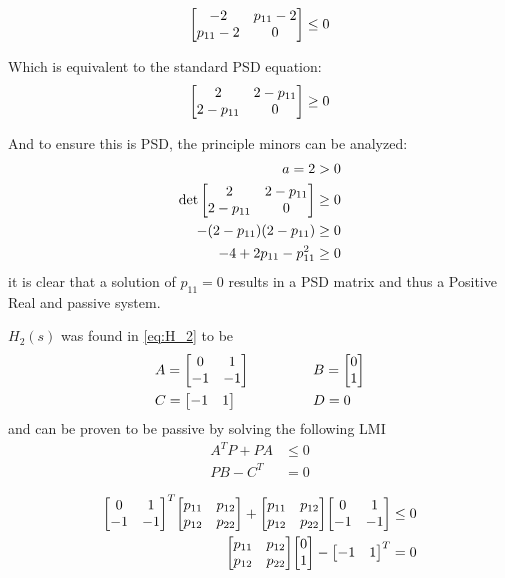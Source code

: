 \documentclass[letter]{article}
\begin{document}
\begin{align}
	\mqty[-2 & p_{11} - 2\\ p_{11} - 2 & 0] \leq 0
\end{align}

Which is equivalent to the standard PSD equation: 
\begin{align}
	\mqty[2 & 2 - p_{11}\\ 2 - p_{11} & 0] \geq 0
\end{align}

And to ensure this is PSD, the principle minors can be analyzed:
\begin{align}
	a = 2 &> 0\\
	\det\mqty[2 & 2 - p_{11}\\ 2 - p_{11} & 0] &\geq 0\\
	-(2-p_{11})(2-p_{11}) &\geq 0\\
	-4 +2 p_{11} - p_{11}^2 &\geq 0
\end{align}
it is clear that a solution of $p_{11} = 0$ results in a PSD matrix and thus a Positive Real and passive system.

\newpage
$H_2(s)$ was found in \eqref{eq:H_2} to be
\begin{equation}\nonumber
	\begin{aligned}
		&A = \mqty[0 &1\\ -1 &-1] \hspace{0.5in} &&B = \mqty[0\\ 1]\\
		&C = \mqty[-1 & 1] \hspace{0.5in} &&D = 0
	\end{aligned}
\end{equation}
and can be proven to be passive by solving the following LMI
\begin{align}
	A^T P + P A &\leq 0\\
	P B - C^T &= 0
\end{align}

\begin{align}
	\mqty[0 &1\\ -1 &-1]^T \mqty[p_{11} & p_{12}\\ p_{12} & p_{22}] + \mqty[p_{11} & p_{12}\\ p_{12} & p_{22}] \mqty[0 &1\\ -1 &-1] &\leq 0\\
	\mqty[p_{11} & p_{12}\\ p_{12} & p_{22}] \mqty[0\\ 1] - \mqty[-1 & 1]^T &= 0
\end{align}
\end{document}
